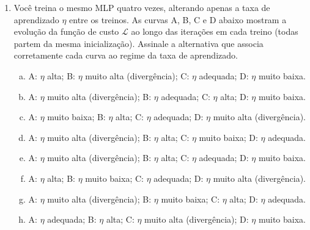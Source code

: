 \documentclass{dlproblemset}
\begin{document}
\begin{enumerate}[1)]
    \item Você treina o mesmo MLP quatro vezes, alterando apenas a taxa de aprendizado $\eta$ entre os treinos. As curvas A, B, C e D abaixo mostram a evolução da função de custo $\mathcal{L}$ ao longo das iterações em cada treino (todas partem da mesma inicialização). Assinale a alternativa que associa corretamente cada curva ao regime da taxa de aprendizado.

    \begin{center}
    \end{center}

    \begin{enumerate}[(a)]
        \item A: $\eta$ alta; \quad B: $\eta$ muito alta (divergência); \quad C: $\eta$ adequada; \quad D: $\eta$ muito baixa.
        \item A: $\eta$ muito alta (divergência); \quad B: $\eta$ adequada; \quad C: $\eta$ alta; \quad D: $\eta$ muito baixa.
        \item A: $\eta$ muito baixa; \quad B: $\eta$ alta; \quad C: $\eta$ adequada; \quad D: $\eta$ muito alta (divergência).
        \item A: $\eta$ muito alta (divergência); \quad B: $\eta$ alta; \quad C: $\eta$ muito baixa; \quad D: $\eta$ adequada.
        \item A: $\eta$ muito alta (divergência); \quad B: $\eta$ alta; \quad C: $\eta$ adequada; \quad D: $\eta$ muito baixa.
        \item A: $\eta$ alta; \quad B: $\eta$ muito baixa; \quad C: $\eta$ adequada; \quad D: $\eta$ muito alta (divergência).
        \item A: $\eta$ muito alta (divergência); \quad B: $\eta$ muito baixa; \quad C: $\eta$ alta; \quad D: $\eta$ adequada.
        \item A: $\eta$ adequada; \quad B: $\eta$ alta; \quad C: $\eta$ muito alta (divergência); \quad D: $\eta$ muito baixa.
    \end{enumerate}


\end{enumerate}
\end{document}
